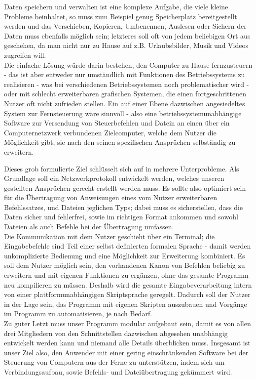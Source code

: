 %

%
Daten speichern und verwalten ist eine komplexe Aufgabe, die viele kleine Probleme beinhaltet, so muss zum Beispiel genug Speicherplatz bereitgestellt werden und das Verschieben, Kopieren, Umbenennen, Auslesen oder Sichern der Daten muss ebenfalls möglich sein; letzteres soll oft von jedem beliebigen Ort aus geschehen, da man nicht nur zu Hause auf z.B. Urlaubsbilder, Musik und Videos zugreifen will.\\
Die einfache Lösung würde darin bestehen, den Computer zu Hause fernzusteuern - das ist aber entweder nur umständlich mit Funktionen des Betriebssystems zu realisieren - was bei verschiedenen Betriebssystemen noch problematischer wird - oder mit schlecht erweiterbaren grafischen Systemen, die einen fortgeschrittenen Nutzer oft nicht zufrieden stellen.
Ein auf einer Ebene dazwischen angesiedeltes System zur Fernsteuerung wäre sinnvoll - also eine betriebssystemunabhängige Software zur Versendung von Steuerbefehlen und Datein an einen über ein Computernetzwerk verbundenen Zielcomputer, welche dem Nutzer die Möglichkeit gibt, sie nach den seinen spezifischen Ansprüchen selbständig zu erweitern.

Dieses grob formulierte Ziel schlüsselt sich auf in mehrere Unterprobleme. Als Grundlage soll ein Netzwerkprotokoll entwickelt werden, welches unseren gestellten Ansprüchen gerecht erstellt werden muss. 
Es sollte also optimiert sein für die Übertragung von Anweisungen eines vom Nutzer erweiterbaren Befehlssatzes, und Dateien jeglichen Typs; dabei muss es sicherstellen, dass die Daten sicher und fehlerfrei, sowie im richtigen Format ankommen und sowohl Dateien als auch Befehle bei der Übertragung umfassen.\\
Die Kommunikation mit dem Nutzer geschieht über ein Terminal; die Eingabebefehle sind Teil einer selbst definierten formalen Sprache - damit werden unkomplizierte Bedienung und eine Möglichkeit zur Erweiterung kombiniert.
Es soll dem Nutzer möglich sein, den vorhandenen Kanon von Befehlen beliebig zu erweitern und mit eigenen Funktionen zu ergänzen, ohne das gesamte Programm neu kompilieren zu müssen. Deshalb wird die gesamte Eingabeverarbeitung intern von einer plattformunabhängigen Skriptsprache geregelt.
Dadurch soll der Nutzer in der Lage sein, das Programm mit eigenen Skripten auszubauen und Vorgänge im Programm zu automatisieren, je nach Bedarf.\\
Zu guter Letzt muss unser Programm modular aufgebaut sein, damit es von allen drei Mitgliedern von den Schnittstellen dazwischen abgesehen unabhängig entwickelt werden kann und niemand alle Details überblicken muss.
Insgesamt ist unser Ziel also, den Anwender mit einer gering einschränkenden Software bei der Steuerung von Computern aus der Ferne zu unterstützen, indem sich um Verbindungsaufbau, sowie Befehls- und Dateiübertragung gekümmert wird.

%